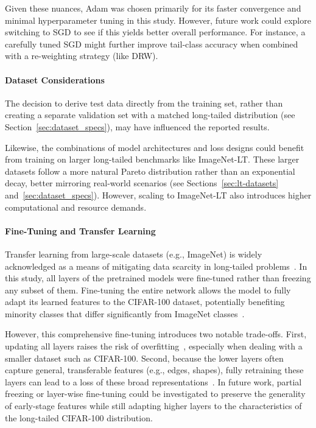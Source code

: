 Given these nuances, Adam was chosen primarily for its faster convergence and minimal hyperparameter tuning in this study. However, future work could explore switching to SGD to see if this yields better overall performance. For instance, a carefully tuned SGD might further improve tail-class accuracy when combined with a re-weighting strategy (like DRW).

\paragraph{Dataset Considerations}
The decision to derive test data directly from the training set, rather than creating a separate validation set with a matched long-tailed distribution (see Section~\ref{sec:dataset_specs}), may have influenced the reported results.

Likewise, the combinations of model architectures and loss designs could benefit from training on larger long-tailed benchmarks like ImageNet-LT. These larger datasets follow a more natural Pareto distribution rather than an exponential decay, better mirroring real-world scenarios (see Sections~\ref{sec:lt-datasets} and~\ref{sec:dataset_specs}). However, scaling to ImageNet-LT also introduces higher computational and resource demands.

\paragraph{Fine-Tuning and Transfer Learning}
Transfer learning from large-scale datasets (e.g., ImageNet) is widely acknowledged as a means of mitigating data scarcity in long-tailed problems~\cite{cs231n,ye2023partialfinetuningsuccessorfinetuning,kandel2020}. In this study, all layers of the pretrained models were fine-tuned rather than freezing any subset of them. Fine-tuning the entire network allows the model to fully adapt its learned features to the CIFAR-100 dataset, potentially benefiting minority classes that differ significantly from ImageNet classes~\cite{ye2023partialfinetuningsuccessorfinetuning}.

However, this comprehensive fine-tuning introduces two notable trade-offs. First, updating all layers raises the risk of overfitting~\cite{cs231n}, especially when dealing with a smaller dataset such as CIFAR-100. Second, because the lower layers often capture general, transferable features (e.g., edges, shapes), fully retraining these layers can lead to a loss of these broad representations~\cite{cs231n,yosinski2014transferablefeaturesdeepneural}. In future work, partial freezing or layer-wise fine-tuning could be investigated to preserve the generality of early-stage features while still adapting higher layers to the characteristics of the long-tailed CIFAR-100 distribution.




